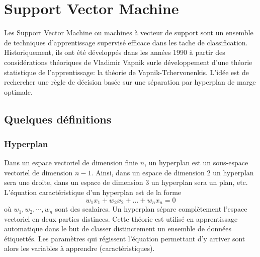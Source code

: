 
\section{Support Vector Machine}

Les \og{}Support Vector Machine\fg{} ou machines à vecteur de support sont un
ensemble de techniques d'apprentissage supervisé efficace dans les tache de
classification. Historiquement, ils ont été développés dans les années 1990 à
partir des considérations théoriques de Vladimir Vapnik surle développement
d'une théorie statistique de l'apprentissage: la théorie de
Vapnik-Tchervonenkis. L’idée est de rechercher une règle de décision basée 
sur une séparation par hyperplan de marge optimale.

\subsection{Quelques définitions}

\subsubsection{Hyperplan}
Dans un espace vectoriel de dimension finie $n$, un hyperplan est un
sous-espace vectoriel de dimension $n−1$. Ainsi, dans un espace de dimension
$2$ un hyperplan sera une droite, dans un espace de dimension $3$ un hyperplan
sera un plan, etc.
L’équation caractéristique d’un hyperplan est de la forme
\[w_1x_1+w_2x_2+\dots+w_nx_n=0\] où $w_1, w_2, \cdots, w_n$ sont des scalaires.
Un hyperplan sépare complètement l'espace vectoriel en deux parties distinces.
Cette théorie est utilisé en apprentissage automatique dans le but de classer
distinctement un ensemble de données étiquettés.  Les paramètres qui régissent
l'équation permettant d'y arriver sont alors les variables à apprendre
(caractéristiques).

